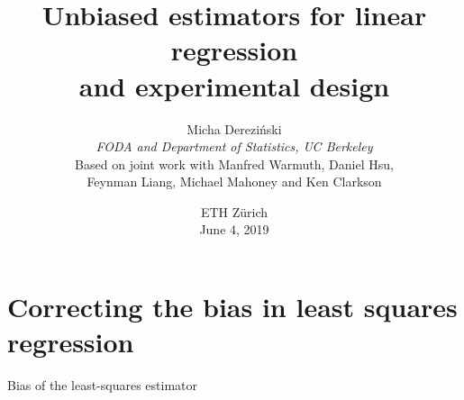 \documentclass{beamer}
\title[]{Unbiased estimators for linear regression \\
  and experimental design}
\author[]{Micha{\polishl } Derezi\'{n}ski\\
  \textit{FODA and Department of Statistics, UC Berkeley}\\[4mm]
  \footnotesize Based on joint work with Manfred Warmuth, Daniel Hsu, \\
  Feynman Liang, Michael Mahoney and Ken Clarkson}
\date{ETH Z\"urich\\
  June 4, 2019}
\begin{document}
\begin{frame}
  \titlepage
\end{frame}

\linespread{1.3}

\section{Correcting the bias in least squares regression}

\begin{frame}{Bias of the least-squares estimator}
\begin{columns}
\begin{column}{0.45\textwidth}
\end{column}
\end{columns}
\end{frame}
\end{document}

